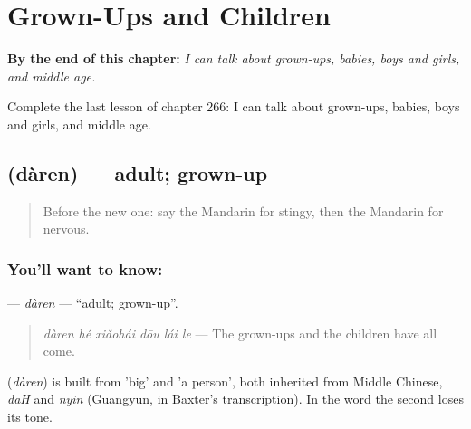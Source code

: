 
\chapter{Grown-Ups and Children}
\label{ch:zh-grown-ups-and-children}

\begin{chapteropening}
\textbf{By the end of this chapter:} \emph{I can talk about grown-ups, babies, boys and girls, and middle age.}

Complete the last lesson of chapter 266: I can talk about grown-ups, babies, boys and girls, and middle age.
\end{chapteropening}

\section[\texorpdfstring{\zh{大人} (dàren)}{大人 (dàren)}]{ (dàren) — adult; grown-up}

\label{lesson:ZH-C266-daren}



\begin{quote}
Before the new one: say the Mandarin for stingy, then the Mandarin for nervous.
\end{quote}

\subsection*{You'll want to know: }
\textbf{} — \emph{dàren} — \textquotedblleft{}adult; grown-up\textquotedblright{}.

\begin{quote}
\textbf{} \emph{dàren hé xiǎohái dōu lái le} — The grown-ups and the children have all come.
\end{quote}

\begin{cousinweb}
\textbf{} (\emph{dàren}) is built from  'big' and  'a person', both inherited from Middle Chinese, \emph{daH} and \emph{nyin} (Guangyun, in Baxter's transcription). In the word the second loses its tone.
\end{cousinweb}


